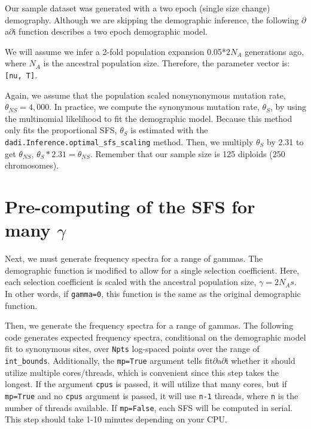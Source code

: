 \documentclass[11pt]{article}
\begin{document}
Our sample dataset was generated with a two epoch (single size change) demography. Although we are skipping the demographic inference, the following $\partial$a$\partial$i function describes a two epoch demographic model.



We will assume we infer a 2-fold population expansion 0.05*2$N_A$ generations ago, where $N_A$ is the ancestral population size. Therefore, the parameter vector is: \texttt{[nu, T]}.



Again, we assume that the population scaled nonsynonymous mutation rate, $\theta_{NS}=4,000$. In practice, we compute the synonymous mutation rate, $\theta_S$, by using the multinomial likelihood to fit the demographic model. Because this method only fits the proportional SFS, $\theta_S$ is estimated with the \texttt{dadi.Inference.optimal\_sfs\_scaling} method. Then, we multiply $\theta_S$ by 2.31 to get $\theta_{NS}$, $\theta_S * 2.31 = \theta_{NS}$. Remember that our sample size is 125 diploids (250 chromosomes).



\section{Pre-computing of the SFS for many $\gamma$}

Next, we must generate frequency spectra for a range of gammas. The demographic function is modified to allow for a single selection coefficient. Here, each selection coefficient is scaled with the ancestral population size, $\gamma=2N_As$. In other words, if \texttt{gamma=0}, this function is the same as the original demographic function.



Then, we generate the frequency spectra for a range of gammas. The following code generates expected frequency spectra, conditional on the demographic model fit to synonymous sites, over \texttt{Npts} log-spaced points over the range of \texttt{int\_bounds}. Additionally, the \texttt{mp=True} argument tells fit$\partial$a$\partial$i whether it should utilize multiple cores/threads, which is convenient since this step takes the longest. If the argument \texttt{cpus} is passed, it will utilize that many cores, but if \texttt{mp=True} and no \texttt{cpus} argument is passed, it will use \texttt{n-1} threads, where \texttt{n} is the number of threads available. If \texttt{mp=False}, each SFS will be computed in serial. This step should take 1-10 minutes depending on your CPU.
\end{document}
